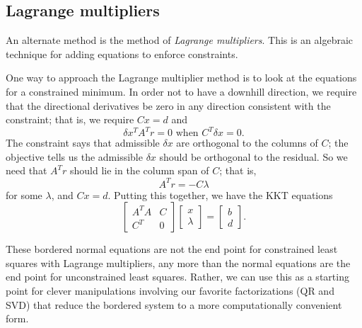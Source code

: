 \subsection{Lagrange multipliers}

An alternate method is the method of {\em Lagrange multipliers}.
This is an algebraic technique for adding equations to enforce constraints.

One way to approach the Lagrange multiplier method is to look at the
equations for a constrained minimum.  In order not to have a downhill
direction, we require that the directional derivatives be zero in any
direction consistent with the constraint; that is, we require $Cx = d$
and
\[
  \delta x^T A^T r = 0 \mbox{ when } C^T \delta x = 0.
\]
The constraint says that admissible $\delta x$ are
orthogonal to the columns of $C$; the objective tells us the admissible
$\delta x$ should be orthogonal to the residual.  So we need that $A^T r$
should lie in the column span of $C$; that is,
\[
  A^T r = -C \lambda
\]
for some $\lambda$, and $Cx = d$.  Putting this together,
we have the KKT equations
\[
  \begin{bmatrix}
    A^T A & C \\
    C^T & 0
  \end{bmatrix}
  \begin{bmatrix} x \\ \lambda \end{bmatrix} =
  \begin{bmatrix} b \\ d \end{bmatrix}.
\]

These bordered normal equations are not the end point for constrained
least squares  with Lagrange multipliers, any more than the normal
equations are the end point for unconstrained least squares.  Rather,
we can use this as a starting point for clever manipulations involving
our favorite factorizations (QR and SVD) that reduce the bordered system
to a more computationally convenient form.
